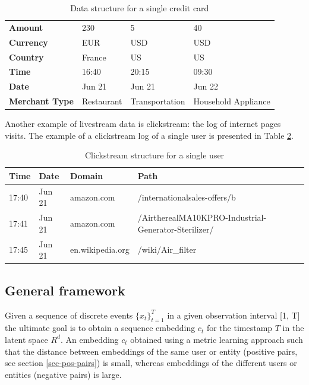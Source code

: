 \documentclass[sigconf]{acmart}
\begin{document}
\begin{table}[ht]
\caption{Data structure for a single credit card}
\begin{tabular}{ | m{7em} |  m{5em} m{5em} m{5em}| }
\hline
\textbf{Amount} & 230 & 5 & 40 \\
\textbf{Currency} & EUR & USD & USD \\
\textbf{Country} & France & US & US \\
\textbf{Time} & 16:40 & 20:15 & 09:30 \\
\textbf{Date} & Jun 21 & Jun 21 & Jun 22 \\
\textbf{Merchant Type} & Restaurant & Transport\-ation & Household Appliance \\
\hline
\end{tabular}
\label{tab-tr-data}
\end{table}

Another example of livestream data is clickstream: the log of internet pages  visits. The example of a clickstream log of a single user is presented in Table \ref{tab-cs-data}.

\begin{table}[ht]
\caption{Clickstream structure for a single user}
\begin{tabular}{ | m{2em} m{3em} m{6em} m{10em}| }
\hline
\textbf{Time} & \textbf{Date} & \textbf{Domain} & \textbf{Path} \\
\hline
17:40 & Jun 21 & amazon.com & /international\-sales-offers/b \\
17:41 & Jun 21 & amazon.com & /Airthereal\-MA10K\-PRO-Industrial-Generator-Sterilizer/ \\
17:45 & Jun 21 & en.wikipedia.org & /wiki\-/Air\_filter \\
\hline
\end{tabular}
\label{tab-cs-data}
\end{table}

\subsection{General framework}

Given a sequence of discrete events $\{x_t \}^T_{t=1}$ in a given observation interval [1, T] the ultimate goal is to obtain a sequence embedding $c_t$ for the timestamp $T$ in the latent space $R^d$. An  embedding $c_t$ obtained using a metric learning approach such that the distance between embeddings of the same user or entity (positive pairs, see section \ref{sec-pos-pairs}) is small, whereas embeddings of the different users or entities (negative pairs) is large. 
\end{document}
